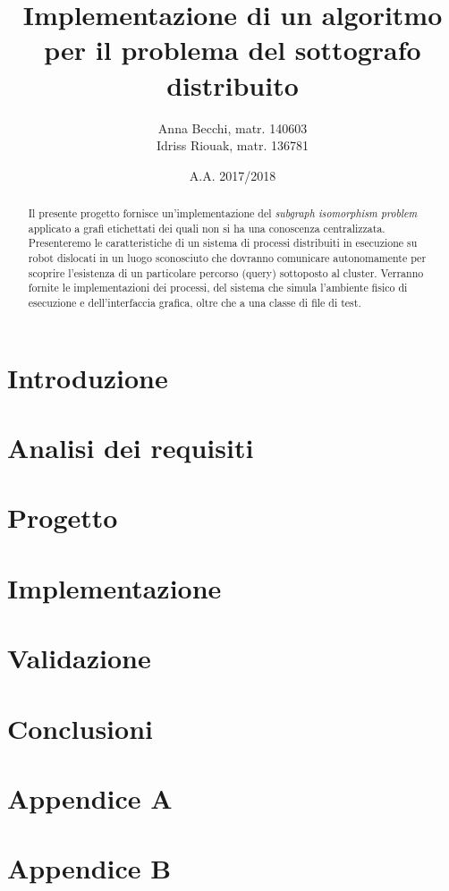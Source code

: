 \documentclass{checkpoint/llncs}
\title{Implementazione di un algoritmo\\
  per il problema del sottografo distribuito}
\author{Anna Becchi, matr. 140603\\
  Idriss Riouak, matr. 136781}
\institute{Laurea Magistrale in Informatica\\Universit\`a di Udine}
\date{A.A. 2017/2018}
\begin{document}
\maketitle
\begin{abstract}
  Il presente progetto fornisce un'implementazione del
  \emph{subgraph isomorphism problem} applicato a grafi
  etichettati dei quali non si ha una conoscenza centralizzata.
  Presenteremo le caratteristiche di un sistema di processi
  distribuiti in esecuzione su robot dislocati in un
  luogo sconosciuto che dovranno comunicare autonomamente
  per scoprire l'esistenza di un particolare percorso
  (query) sottoposto al cluster.
  Verranno fornite le implementazioni dei
  processi, del sistema che simula l'ambiente fisico
  di esecuzione e dell'interfaccia grafica, oltre che a una
  classe di file di test.
\end{abstract}

\section{Introduzione}
\label{ch:intro}


\newpage
\section{Analisi dei requisiti}
\label{ch:analysis}


\newpage
\section{Progetto}
\label{ch:project}


\newpage
\section{Implementazione}
\label{ch:impl}


\newpage
\section{Validazione}
\label{ch:validation}


\newpage
\section{Conclusioni}
\label{ch:conclusions}


\newpage
\appendix
\section{Appendice A}
\label{ch:appendixA}

\newpage

\appendix
\section{Appendice B}
\label{ch:appendixB}

\end{document}
